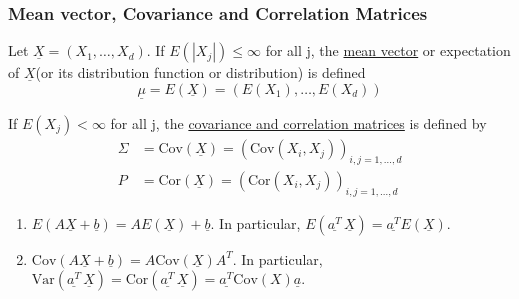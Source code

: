 \documentclass{article}
\newcommand{\Var}{\mathrm{Var}}
\newcommand{\Cov}{\mathrm{Cov}}
\newcommand{\Cor}{\text{Cor}}
\begin{document}
			\subsubsection{Mean vector, Covariance and Correlation Matrices}
			
			\begin{mydef}{}{}
				Let $\underline{X}=(X_1, \dots, X_d)$. If $E(|X_j|)\leq\infty$ for all j, the \ul{mean vector} or expectation of $\underline{X}$(or its distribution function or distribution) is defined $$\underline{\mu}=E(\underline{X})=(E(X_1), \dots, E(X_d))$$
				
				If $E(X_j)<\infty$ for all j, the \ul{covariance and correlation matrices} is defined by
				\begin{align*}
					\Sigma&=\Cov(\underline{X})=(\Cov(X_i, X_j))_{i, j=1, \dots, d}\\
					P&=\Cor(\underline{X})=(\Cor(X_i, X_j))_{i, j=1, \dots, d}
				\end{align*}
			\end{mydef}
			
			\begin{mylem}{}{}
				\begin{enumerate}
					\item $E(A\underline{X}+\underline{b})=AE(\underline{X})+\underline{b}$. In particular, $E(\underline{a^T}\,\underline{X})=\underline{a^T}E(\underline{X})$.
					
					\item $\Cov(A\underline{X}+\underline{b})=A\Cov(\underline{X})A^T$. In particular, $\Var(\underline{a^T}\,\underline{X})=\Cor(\underline{a^T}\,\underline{X})=\underline{a^T}\Cov(X)\underline{a}$.
				\end{enumerate}
			\end{mylem}
	
\end{document}
